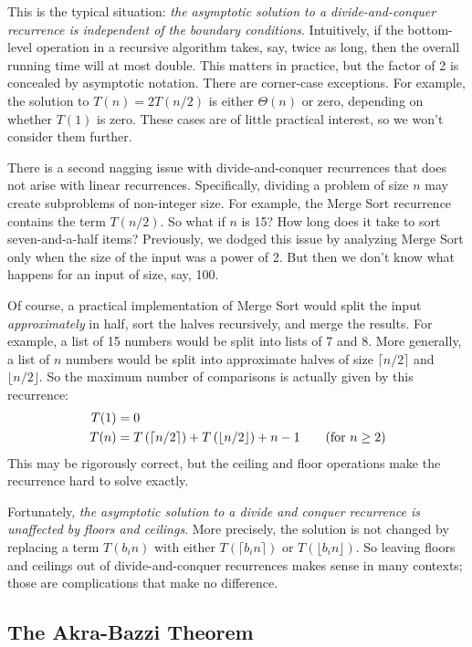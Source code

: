 This is the typical situation: \emph{the asymptotic solution to a
  divide-and-conquer recurrence is independent of the boundary
  conditions}.  Intuitively, if the bottom-level operation in a
recursive algorithm takes, say, twice as long, then the overall
running time will at most double.  This matters in practice, but the
factor of 2 is concealed by asymptotic notation.  There are
corner-case exceptions.  For example, the solution to $T(n) = 2
T(n/2)$ is either $\Theta(n)$ or zero, depending on whether $T(1)$ is
zero.  These cases are of little practical interest, so we won't
consider them further.

There is a second nagging issue with divide-and-conquer recurrences
that does not arise with linear recurrences.  Specifically, dividing
a problem of size $n$ may create subproblems of non-integer size.  For
example, the Merge Sort recurrence contains the term $T(n/2)$.  So
what if $n$ is 15?  How long does it take to sort seven-and-a-half
items?  Previously, we dodged this issue by analyzing Merge Sort only
when the size of the input was a power of 2.  But then we don't know
what happens for an input of size, say, 100.

Of course, a practical implementation of Merge Sort would split the
input \emph{approximately} in half, sort the halves recursively, and
merge the results.  For example, a list of 15 numbers would be split
into lists of 7 and 8.  More generally, a list of $n$ numbers would be
split into approximate halves of size $\lceil n / 2 \rceil$ and
$\lfloor n / 2 \rfloor$.  So the maximum number of comparisons is
actually given by this recurrence:
\begin{align*}
T(1) & = 0 \\
T(n) & = T\left(\lceil n/2\rceil\right) + T\left(\lfloor
  n/2\rfloor\right)+ n - 1 \text{\qquad (for $n \geq 2$)}
\end{align*}
This may be rigorously correct, but the ceiling and floor operations
make the recurrence hard to solve exactly.

Fortunately, \emph{the asymptotic solution to a divide and conquer
  recurrence is unaffected by floors and ceilings}.  More precisely,
the solution is not changed by replacing a term $T(b_i n)$ with either
$T(\lceil b_i n \rceil)$ or $T(\lfloor b_i n \rfloor)$.  So leaving
floors and ceilings out of divide-and-conquer recurrences makes sense
in many contexts; those are complications that make no difference.

\subsection{The Akra-Bazzi Theorem}

